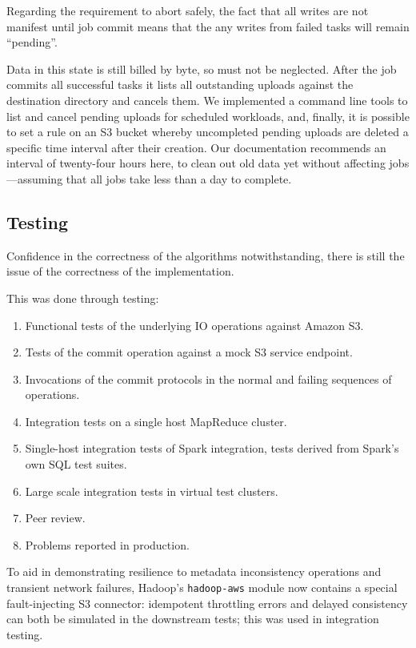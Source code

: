 \documentclass[conference]{IEEEtran}
\begin{document}
Regarding the requirement to abort safely, the fact that all writes are
not manifest until job commit means that the any writes from failed tasks
will remain ``pending''.

Data in this state is still billed by byte, so must not be neglected.
After the job commits all successful tasks it lists all outstanding
uploads against the destination directory and cancels them.
We implemented a command line tools to list and cancel pending uploads for
scheduled workloads, and, finally,
it is possible to set a rule on an S3 bucket whereby uncompleted
pending uploads are deleted a specific time interval after their creation.
Our documentation recommends an interval of twenty-four hours here, to
clean out old data yet without affecting jobs ---assuming that all jobs
take less than a day to complete.


\subsection{Testing}
\label{subsec:testing}

Confidence in the correctness of the algorithms notwithstanding, there
is still the issue of the correctness of the implementation.


This was done through testing:

\begin{enumerate}
  \item Functional tests of the underlying IO operations against Amazon S3.
  \item Tests of the commit operation against a mock S3 service endpoint.
  \item Invocations of the commit protocols in the normal and failing sequences of operations.
  \item Integration tests on a single host MapReduce cluster.
  \item Single-host integration tests of Spark integration, tests derived from Spark's own SQL test suites.
  \item Large scale integration tests in virtual test clusters.
  \item Peer review.
  \item Problems reported in production.
\end{enumerate}

To aid in demonstrating resilience to metadata inconsistency
operations and transient network failures, Hadoop's \texttt{hadoop-aws} module
now contains a special fault-injecting S3 connector: idempotent throttling errors and
delayed consistency can both be simulated in the downstream tests;
this was used in integration testing.
\end{document}
